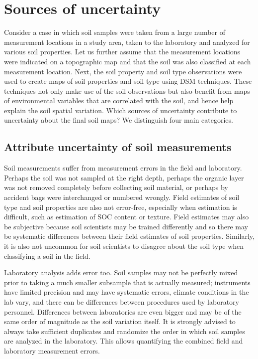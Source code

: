 \documentclass[10pt,b5paper,]{book}
\theoremstyle{definition}
\theoremstyle{definition}
\theoremstyle{definition}
\theoremstyle{remark}
\begin{document}
\hypertarget{sourcesuncert}{%
\section{Sources of uncertainty}\label{sourcesuncert}}

Consider a case in which soil samples were taken from a large number of
measurement locations in a study area, taken to the laboratory and
analyzed for various soil properties. Let us further assume that the
measurement locations were indicated on a topographic map and that the
soil was also classified at each measurement location. Next, the soil
property and soil type observations were used to create maps of soil
properties and soil type using DSM techniques. These techniques not only
make use of the soil observations but also benefit from maps of
environmental variables that are correlated with the soil, and hence
help explain the soil spatial variation. Which sources of uncertainty
contribute to uncertainty about the final soil maps? We distinguish four
main categories.

\hypertarget{attribute-uncertainty-of-soil-measurements}{%
\subsection{Attribute uncertainty of soil
measurements}\label{attribute-uncertainty-of-soil-measurements}}

Soil measurements suffer from measurement errors in the field and
laboratory. Perhaps the soil was not sampled at the right depth, perhaps
the organic layer was not removed completely before collecting soil
material, or perhaps by accident bags were interchanged or numbered
wrongly. Field estimates of soil type and soil properties are also not
error-free, especially when estimation is difficult, such as estimation
of SOC content or texture. Field estimates may also be subjective
because soil scientists may be trained differently and so there may be
systematic differences between their field estimates of soil properties.
Similarly, it is also not uncommon for soil scientists to disagree about
the soil type when classifying a soil in the field.

Laboratory analysis adds error too. Soil samples may not be perfectly
mixed prior to taking a much smaller subsample that is actually
measured; instruments have limited precision and may have systematic
errors, climate conditions in the lab vary, and there can be differences
between procedures used by laboratory personnel. Differences between
laboratories are even bigger and may be of the same order of magnitude
as the soil variation itself. It is strongly advised to always take
sufficient duplicates and randomize the order in which soil samples are
analyzed in the laboratory. This allows quantifying the combined field
and laboratory measurement errors.
\end{document}
